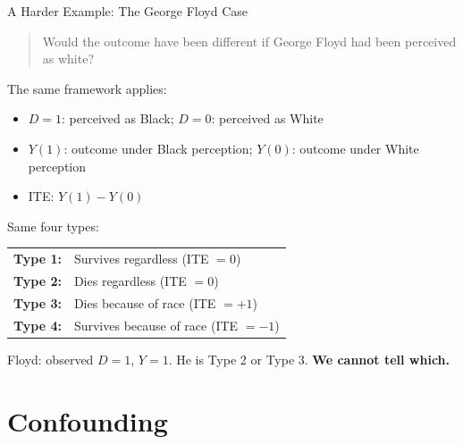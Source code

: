 \documentclass[aspectratio=169, 11pt, handout]{beamer}
\begin{document}
\begin{frame}{A Harder Example: The George Floyd Case}

\begin{quote}
Would the outcome have been different if George Floyd had been perceived as white?
\end{quote}

\pause
\medskip

The same framework applies:
\begin{itemize}
    \item $D = 1$: perceived as Black; $D = 0$: perceived as White
    \item $Y(1)$: outcome under Black perception; $Y(0)$: outcome under White perception
    \item ITE: $Y(1) - Y(0)$
\end{itemize}

\medskip
\pause

Same four types:
\begin{center}
\small
\begin{tabular}{ll}
\textbf{Type 1:} & Survives regardless (ITE $= 0$) \\
\textbf{Type 2:} & Dies regardless (ITE $= 0$) \\
\textbf{Type 3:} & Dies because of race (ITE $= +1$) \\
\textbf{Type 4:} & Survives because of race (ITE $= -1$) \\
\end{tabular}
\end{center}

\medskip

Floyd: observed $D = 1$, $Y = 1$. He is Type 2 or Type 3. \textbf{We cannot tell which.}
\end{frame}

\section{Confounding}
\end{document}
